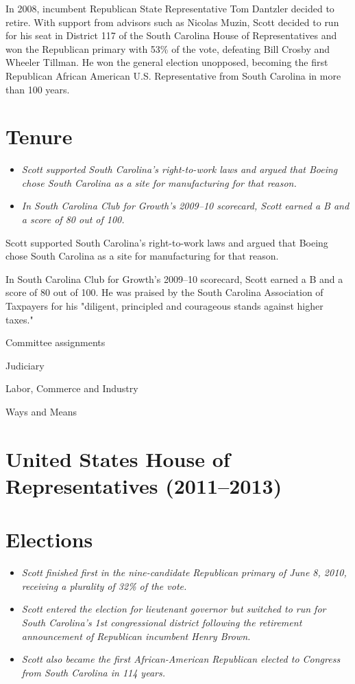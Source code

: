 In 2008, incumbent Republican State Representative Tom Dantzler decided
to retire. With support from advisors such as Nicolas Muzin, Scott
decided to run for his seat in District 117 of the South Carolina House
of Representatives and won the Republican primary with 53\% of the vote,
defeating Bill Crosby and Wheeler Tillman. He won the general election
unopposed, becoming the first Republican African American U.S.
Representative from South Carolina in more than 100 years.

\section{Tenure}\label{tenure-1}

\begin{itemize}
\item
  \emph{Scott supported South Carolina's right-to-work laws and argued
  that Boeing chose South Carolina as a site for manufacturing for that
  reason.}
\item
  \emph{In South Carolina Club for Growth's 2009--10 scorecard, Scott
  earned a B and a score of 80 out of 100.}
\end{itemize}

Scott supported South Carolina's right-to-work laws and argued that
Boeing chose South Carolina as a site for manufacturing for that reason.

In South Carolina Club for Growth's 2009--10 scorecard, Scott earned a B
and a score of 80 out of 100. He was praised by the South Carolina
Association of Taxpayers for his "diligent, principled and courageous
stands against higher taxes."

Committee assignments

Judiciary

Labor, Commerce and Industry

Ways and Means

\section{United States House of Representatives
(2011--2013)}\label{united-states-house-of-representatives-20112013}

\section{Elections}\label{elections-2}

\begin{itemize}
\item
  \emph{Scott finished first in the nine-candidate Republican primary of
  June 8, 2010, receiving a plurality of 32\% of the vote.}
\item
  \emph{Scott entered the election for lieutenant governor but switched
  to run for South Carolina's 1st congressional district following the
  retirement announcement of Republican incumbent Henry Brown.}
\item
  \emph{Scott also became the first African-American Republican elected
  to Congress from South Carolina in 114 years.}
\end{itemize}

